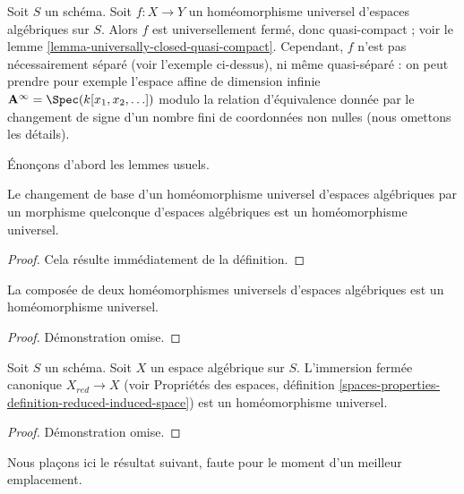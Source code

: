 \noindent
Soit $S$ un schéma.
Soit $f : X \to Y$ un homéomorphisme universel d'espaces algébriques
sur $S$. Alors $f$ est universellement fermé, donc quasi-compact ; voir le
lemme \ref{lemma-universally-closed-quasi-compact}.
Cependant, $f$ n'est pas nécessairement séparé (voir l'exemple ci-dessus), ni même
quasi-séparé : on peut prendre pour exemple l'espace affine de dimension infinie
$\mathbf{A}^\infty = \Spec(k[x_1, x_2, \ldots])$ modulo
la relation d'équivalence donnée par le changement de signe d'un nombre fini de
coordonnées non nulles (nous omettons les détails).

\medskip\noindent
Énonçons d'abord les lemmes usuels.

\begin{lemma}
\label{lemma-base-change-universal-homeomorphism}
Le changement de base d'un homéomorphisme universel d'espaces algébriques
par un morphisme quelconque d'espaces algébriques est un homéomorphisme universel.
\end{lemma}

\begin{proof}
Cela résulte immédiatement de la définition.
\end{proof}

\begin{lemma}
\label{lemma-composition-universal-homeomorphism}
La composée de deux homéomorphismes universels
d'espaces algébriques est un homéomorphisme universel.
\end{lemma}

\begin{proof}
Démonstration omise.
\end{proof}

\begin{lemma}
\label{lemma-reduction-universal-homeomorphism}
Soit $S$ un schéma. Soit $X$ un espace algébrique sur $S$.
L'immersion fermée canonique $X_{red} \to X$ (voir
Propriétés des espaces, définition
\ref{spaces-properties-definition-reduced-induced-space})
est un homéomorphisme universel.
\end{lemma}

\begin{proof}
Démonstration omise.
\end{proof}

\noindent
Nous plaçons ici le résultat suivant, faute pour le moment d'un meilleur
emplacement.

